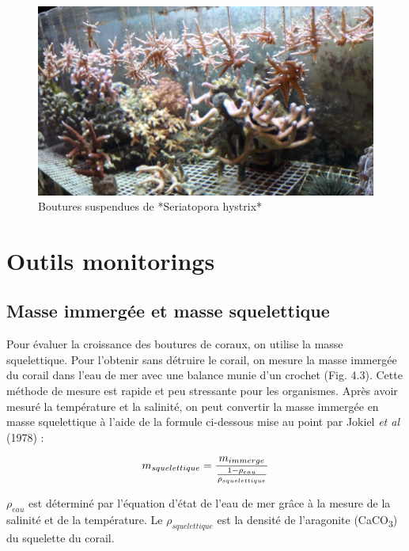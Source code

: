 \documentclass[]{report}
\begin{document}
\begin{figure}[h!]
\includegraphics[]{../image/boutures.jpg}
\caption{Boutures suspendues de *Seriatopora hystrix*}
\end{figure}

\section{Outils monitorings}\label{outils-monitorings}

\subsection{Masse immergée et masse
squelettique}\label{masse-immergee-et-masse-squelettique}

Pour évaluer la croissance des boutures de coraux, on utilise la masse
squelettique. Pour l'obtenir sans détruire le corail, on mesure la masse
immergée du corail dans l'eau de mer avec une balance munie d'un crochet
(Fig. 4.3). Cette méthode de mesure est rapide et peu stressante pour
les organismes. Après avoir mesuré la température et la salinité, on
peut convertir la masse immergée en masse squelettique à l'aide de la
formule ci-dessous mise au point par Jokiel \emph{et al} (1978) :

\begin{equation}
\large
  m_{squelettique} = \frac {m_{immerge}}{ \frac{1 - \rho_{eau}}{ \rho_{squelettique}}}
\end{equation}

\(\rho_{eau}\) est déterminé par l'équation d'état de l'eau de mer grâce
à la mesure de la salinité et de la température. Le
\(\rho_{squelettique}\) est la densité de l'aragonite
(CaCO\textsubscript{3}) du squelette du corail.
\end{document}
